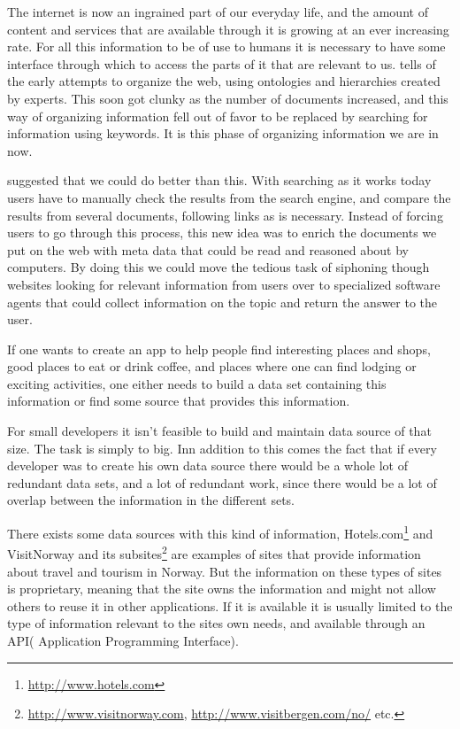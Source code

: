 The internet is now an ingrained part of our everyday life, and the amount of content and services that are available through it is growing at an ever increasing rate. 
For all this information to be of use to humans it is necessary to have some interface through which to access the parts of it that are relevant to us. 
\citet{Shirky2007} tells of the early attempts to organize the web, using ontologies and hierarchies created by experts. 
This soon got clunky as the number of documents increased, and this way of organizing information fell out of favor to be replaced by searching for information using keywords. 
It is this phase of organizing information we are in now. 

\citet{Berners-Lee2001} suggested that we could do better than this. 
With searching as it works today users have to manually check the results from the search engine, and compare the results from several documents, following links as is necessary. 
Instead of forcing users to go through this process, this new idea was to enrich the documents we put on the web with meta data that could be read and reasoned about by computers. 
By doing this we could move the tedious task of siphoning though websites looking for relevant information from users over to specialized software agents that could collect information on the topic and return the answer to the user.


If one wants to create an app to help people find interesting places and shops, good places to eat or drink coffee, and places where one can find lodging or exciting activities, 
one either needs to build a data set containing this information or find some source that provides this information.

For small developers it isn't feasible to build and maintain data source of that size. The task is simply to big. 
Inn addition to this comes the fact that if every developer was to create his own data source there would be a whole lot of redundant data sets, and a lot of redundant work, since there would be a lot of overlap between the information in the different sets.

There exists some data sources with this kind of information, Hotels.com\footnote{\url{http://www.hotels.com}} and VisitNorway and its subsites\footnote{\url{http://www.visitnorway.com}, \url{http://www.visitbergen.com/no/} etc. } are examples of sites that provide information about travel and tourism in Norway.
But the information on these types of sites is proprietary, meaning that the site owns the information and might not allow others to reuse it in other applications. 
If it is available it is usually limited to the type of information relevant to the sites own needs, and available through an API( Application Programming Interface).

